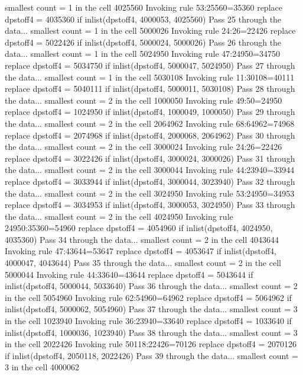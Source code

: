   smallest count = 1 in the cell      4025560
  Invoking rule 53:25560=35360
  replace dpstoff4 = 4035360 if inlist(dpstoff4, 4000053, 4025560)
Pass 25 through the data...
  smallest count = 1 in the cell      5000026
  Invoking rule 24:26=22426
  replace dpstoff4 = 5022426 if inlist(dpstoff4, 5000024, 5000026)
Pass 26 through the data...
  smallest count = 1 in the cell      5024950
  Invoking rule 47:24950=34750
  replace dpstoff4 = 5034750 if inlist(dpstoff4, 5000047, 5024950)
Pass 27 through the data...
  smallest count = 1 in the cell      5030108
  Invoking rule 11:30108=40111
  replace dpstoff4 = 5040111 if inlist(dpstoff4, 5000011, 5030108)
Pass 28 through the data...
  smallest count = 2 in the cell      1000050
  Invoking rule 49:50=24950
  replace dpstoff4 = 1024950 if inlist(dpstoff4, 1000049, 1000050)
Pass 29 through the data...
  smallest count = 2 in the cell      2064962
  Invoking rule 68:64962=74968
  replace dpstoff4 = 2074968 if inlist(dpstoff4, 2000068, 2064962)
Pass 30 through the data...
  smallest count = 2 in the cell      3000024
  Invoking rule 24:26=22426
  replace dpstoff4 = 3022426 if inlist(dpstoff4, 3000024, 3000026)
Pass 31 through the data...
  smallest count = 2 in the cell      3000044
  Invoking rule 44:23940=33944
  replace dpstoff4 = 3033944 if inlist(dpstoff4, 3000044, 3023940)
Pass 32 through the data...
  smallest count = 2 in the cell      3024950
  Invoking rule 53:24950=34953
  replace dpstoff4 = 3034953 if inlist(dpstoff4, 3000053, 3024950)
Pass 33 through the data...
  smallest count = 2 in the cell      4024950
  Invoking rule 24950:35360=54960
  replace dpstoff4 = 4054960 if inlist(dpstoff4, 4024950, 4035360)
Pass 34 through the data...
  smallest count = 2 in the cell      4043644
  Invoking rule 47:43644=53647
  replace dpstoff4 = 4053647 if inlist(dpstoff4, 4000047, 4043644)
Pass 35 through the data...
  smallest count = 2 in the cell      5000044
  Invoking rule 44:33640=43644
  replace dpstoff4 = 5043644 if inlist(dpstoff4, 5000044, 5033640)
Pass 36 through the data...
  smallest count = 2 in the cell      5054960
  Invoking rule 62:54960=64962
  replace dpstoff4 = 5064962 if inlist(dpstoff4, 5000062, 5054960)
Pass 37 through the data...
  smallest count = 3 in the cell      1023940
  Invoking rule 36:23940=33640
  replace dpstoff4 = 1033640 if inlist(dpstoff4, 1000036, 1023940)
Pass 38 through the data...
  smallest count = 3 in the cell      2022426
  Invoking rule 50118:22426=70126
  replace dpstoff4 = 2070126 if inlist(dpstoff4, 2050118, 2022426)
Pass 39 through the data...
  smallest count = 3 in the cell      4000062
